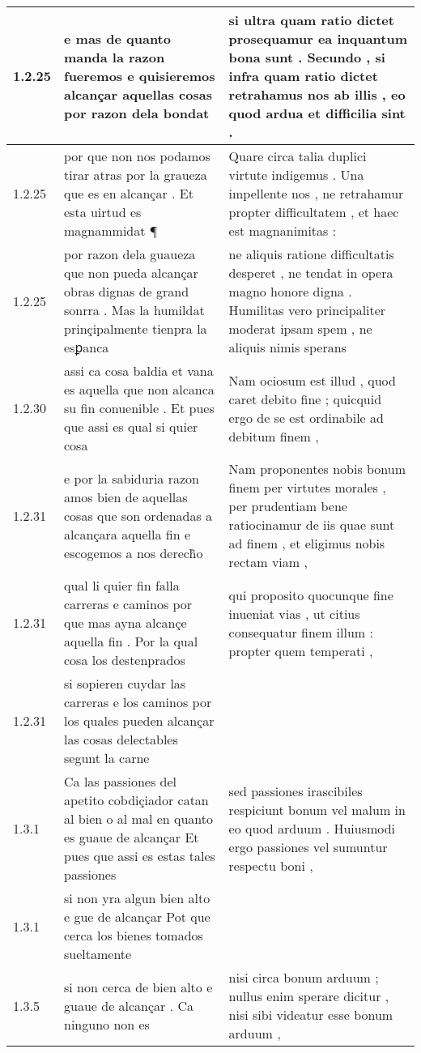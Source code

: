 \begin{tabular}{|p{1cm}|p{6.5cm}|p{6.5cm}|}
1.2.25 & e mas de quanto manda la razon fueremos e quisieremos alcançar aquellas cosas por razon dela bondat & si ultra quam ratio dictet prosequamur ea inquantum bona sunt . Secundo , si infra quam ratio dictet retrahamus nos ab illis , eo quod ardua et difficilia sint . \\\hline
1.2.25 & por que non nos podamos tirar atras por la graueza que es en alcançar . Et esta uirtud es magnammidat ¶ & Quare circa talia duplici virtute indigemus . Una impellente nos , ne retrahamur propter difficultatem , et haec est magnanimitas : \\\hline
1.2.25 & por razon dela guaueza que non pueda alcançar obras dignas de grand sonrra . Mas la humildat prinçipalmente tienpra la esꝑanca & ne aliquis ratione difficultatis desperet , ne tendat in opera magno honore digna . Humilitas vero principaliter moderat ipsam spem , ne aliquis nimis sperans \\\hline
1.2.30 & assi ca cosa baldia et vana es aquella que non alcanca su fin conuenible . Et pues que assi es qual si quier cosa & Nam ociosum est illud , quod caret debito fine ; quicquid ergo de se est ordinabile ad debitum finem , \\\hline
1.2.31 & e por la sabiduria razon amos bien de aquellas cosas que son ordenadas a alcançara aquella fin e escogemos a nos derech̃o & Nam proponentes nobis bonum finem per virtutes morales , per prudentiam bene ratiocinamur de iis quae sunt ad finem , et eligimus nobis rectam viam , \\\hline
1.2.31 & qual li quier fin falla carreras e caminos por que mas ayna alcançe aquella fin . Por la qual cosa los destenprados & qui proposito quocunque fine inueniat vias , ut citius consequatur finem illum : propter quem temperati , \\\hline
1.2.31 & si sopieren cuydar las carreras e los caminos por los quales pueden alcançar las cosas delectables segunt la carne &  \\\hline
1.3.1 & Ca las passiones del apetito cobdiçiador catan al bien o al mal en quanto es guaue de alcançar Et pues que assi es estas tales passiones & sed passiones irascibiles respiciunt bonum vel malum in eo quod arduum . Huiusmodi ergo passiones vel sumuntur respectu boni , \\\hline
1.3.1 & si non yra algun bien alto e gue de alcançar Pot que cerca los bienes tomados sueltamente &  \\\hline
1.3.5 & si non cerca de bien alto e guaue de alcançar . Ca ninguno non es & nisi circa bonum arduum ; nullus enim sperare dicitur , nisi sibi videatur esse bonum arduum , \\\hline

\end{tabular}
